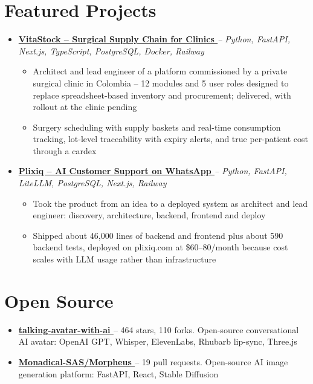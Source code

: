\documentclass[letterpaper,10pt]{article}
\newcommand{\normalfaExternalLink}{{\mdseries\faExternalLink}}
\begin{document}
\section{Featured Projects}
\begin{itemize}[leftmargin=*, itemsep=2pt]
    \item \textbf{\href{https://vitastock.piagents.dev}{VitaStock -- Surgical Supply Chain for Clinics \normalfaExternalLink}} \textit{-- Python, FastAPI, Next.js, TypeScript, PostgreSQL, Docker, Railway}
    \begin{itemize}[itemsep=0pt]
        \item Architect and lead engineer of a platform commissioned by a private surgical clinic in Colombia -- 12 modules and 5 user roles designed to replace spreadsheet-based inventory and procurement; delivered, with rollout at the clinic pending
        \item Surgery scheduling with supply baskets and real-time consumption tracking, lot-level traceability with expiry alerts, and true per-patient cost through a cardex
    \end{itemize}
    \item \textbf{\href{https://plixiq.com}{Plixiq -- AI Customer Support on WhatsApp \normalfaExternalLink}} \textit{-- Python, FastAPI, LiteLLM, PostgreSQL, Next.js, Railway}
    \begin{itemize}[itemsep=0pt]
        \item Took the product from an idea to a deployed system as architect and lead engineer: discovery, architecture, backend, frontend and deploy
        \item Shipped about 46,000 lines of backend and frontend plus about 590 backend tests, deployed on plixiq.com at \$60--80/month because cost scales with LLM usage rather than infrastructure
    \end{itemize}
\end{itemize}

\section{Open Source}
\begin{itemize}[leftmargin=*, itemsep=0pt]
    \item \textbf{\href{https://github.com/asanchezyali/talking-avatar-with-ai}{talking-avatar-with-ai \normalfaExternalLink}} -- 464 stars, 110 forks. Open-source conversational AI avatar: OpenAI GPT, Whisper, ElevenLabs, Rhubarb lip-sync, Three.js
    \item \textbf{\href{https://github.com/Monadical-SAS/Morpheus}{Monadical-SAS/Morpheus \normalfaExternalLink}} -- 19 pull requests. Open-source AI image generation platform: FastAPI, React, Stable Diffusion
\end{itemize}
\end{document}
